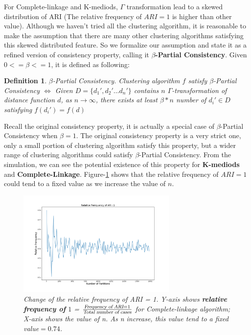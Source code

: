 \documentclass{uonmathreport}
\newtheorem{definition}{Definition}[section]
\begin{document}
For Complete-linkage and K-mediods, $\Gamma$ transformation lead to a skewed distribution of ARI (The relative frequency of $ARI =1$ is higher than other value). Although we haven't tried all the clustering algorithm, it is reasonable to make the assumption that there are many other clustering algorithms satisfying this skewed distributed feature. So we formalize our assumption and state it as a refined version of consistency property, calling it \textbf{$\beta$-Partial Consistency}. 
Given $0<=\beta<=1$, it is defined as following:
\begin{definition}
$\beta $-Partial Consistency. Clustering algorithm $f$ satisfy $\beta$-Partial Consistency $\iff$ Given $D=\{d_1',d_2'\ldots d_n'\}$ contains $n$ $\Gamma$-transformation of distance function $d$, as $n\rightarrow \infty$, there exists at least $\beta *n$ number of $d_i'\in D$ satisfying $f(d_i')=f(d)$ 
\end{definition}
Recall the original consistency property, it is actually a special case of $\beta $-Partial Consistency when $\beta = 1$. The original consistency property is a very strict one, only a small portion of clustering algorithm satisfy this property, but a wider range of clustering algorithms could satisfy $\beta$-Partial Consistency. From the simulation, we can see the potential existence of this property for \textbf{K-mediods} and \textbf{Complete-Linkage}. Figure-\ref{fig:single-linkage4} shows that the relative frequency of $ARI=1$ could tend to a fixed value as we increase the value of $n$.

\begin{figure}[H]
 \begin{center}
   \includegraphics[width=0.7\textwidth]{convergence.png}
 \end{center}
 \caption{\textit{Change of the relative frequency of ARI = 1. Y-axis shows \textbf{relative frequency of} $1$ = $\frac{\textsl{Frequency of ARI}=1}{\textsl{Total number of cases}} $ for Complete-linkage algorithm; X-axis shows the value of n. As n increase, this value tend to a fixed value$=0.74$.}}
 \label{fig:single-linkage4}
\end{figure}
\end{document}

